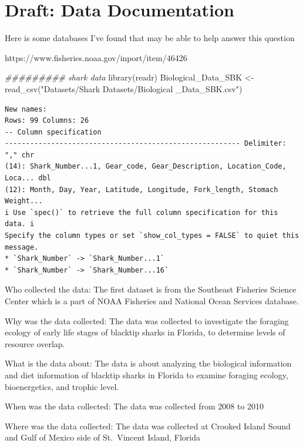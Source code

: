 \documentclass[
  letterpaper,
  DIV=11,
  numbers=noendperiod]{scrreprt}
\newenvironment{Shaded}{\begin{snugshade}}{\end{snugshade}}
\newcommand{\DocumentationTok}[1]{\textcolor[rgb]{0.37,0.37,0.37}{\textit{#1}}}
\newcommand{\FunctionTok}[1]{\textcolor[rgb]{0.28,0.35,0.67}{#1}}
\newcommand{\NormalTok}[1]{\textcolor[rgb]{0.00,0.23,0.31}{#1}}
\newcommand{\OtherTok}[1]{\textcolor[rgb]{0.00,0.23,0.31}{#1}}
\newcommand{\StringTok}[1]{\textcolor[rgb]{0.13,0.47,0.30}{#1}}
\begin{document}
\chapter{Draft: Data Documentation}\label{draft-data-documentation}

Here is some databases I've found that may be able to help answer this
question

https://www.fisheries.noaa.gov/inport/item/46426

\begin{Shaded}
\begin{Highlighting}[]
\DocumentationTok{\#\#\#\#\#\#\#\#\# shark data}
\FunctionTok{library}\NormalTok{(readr)}
\NormalTok{Biological\_Data\_SBK }\OtherTok{\textless{}{-}} \FunctionTok{read\_csv}\NormalTok{(}\StringTok{"Datasets/Shark Datasets/Biological \_Data\_SBK.csv"}\NormalTok{)}
\end{Highlighting}
\end{Shaded}

\begin{verbatim}
New names:
Rows: 99 Columns: 26
-- Column specification
-------------------------------------------------------- Delimiter: "," chr
(14): Shark_Number...1, Gear_code, Gear_Description, Location_Code, Loca... dbl
(12): Month, Day, Year, Latitude, Longitude, Fork_length, Stomach Weight...
i Use `spec()` to retrieve the full column specification for this data. i
Specify the column types or set `show_col_types = FALSE` to quiet this message.
* `Shark_Number` -> `Shark_Number...1`
* `Shark_Number` -> `Shark_Number...16`
\end{verbatim}

Who collected the data: The first dataset is from the Southeast
Fisheries Science Center which is a part of NOAA Fisheries and National
Ocean Services database.

Why was the data collected: The data was collected to investigate the
foraging ecology of early life stages of blacktip sharks in Florida, to
determine levels of resource overlap.

What is the data about: The data is about analyzing the biological
information and diet information of blacktip sharks in Florida to
examine foraging ecology, bioenergetics, and trophic level.

When was the data collected: The data was collected from 2008 to 2010

Where was the data collected: The data was collected at Crooked Island
Sound and Gulf of Mexico side of St.~Vincent Island, Florida
\end{document}
